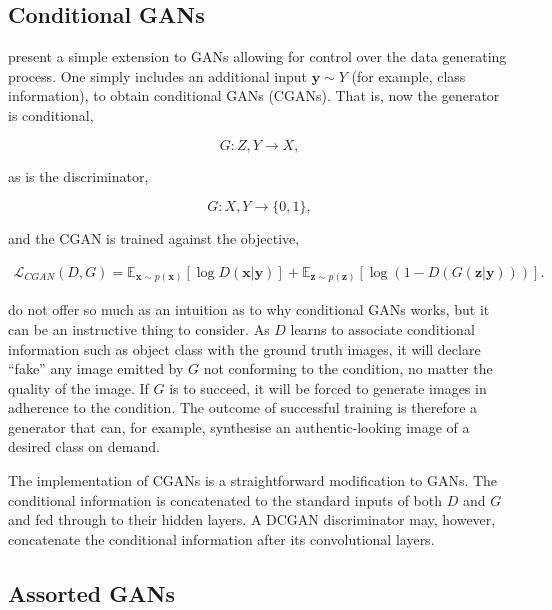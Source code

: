 \subsection{Conditional GANs}
\label{subsec:conditional_gans_definition}
\cite{mirza2014conditional} present a simple extension to GANs allowing for control over the data generating process. One simply includes an additional input $\mathbf{y} \sim Y$ (for example, class information), to obtain conditional GANs (CGANs). That is, now the generator is conditional,

\begin{equation}
G : Z, Y \to X,
\end{equation}

as is the discriminator,

\begin{equation}
G : X, Y \to \{0, 1\},
\end{equation}

and the CGAN is trained against the objective,

\begin{align}\mathcal{L}_{CGAN}(D, G) = \mathbb{E}_{\mathbf{x} \sim p(\mathbf{x})}[\log D(\mathbf{x} | \mathbf{y})] + \mathbb{E}_{\mathbf{z} \sim p(\mathbf{z})}[\log(1 - D(G(\mathbf{z} | \mathbf{y})))].
\end{align}

\cite{mirza2014conditional} do not offer so much as an intuition as to why conditional GANs works, but it can be an instructive thing to consider. As $D$ learns to associate conditional information such as object class with the ground truth images, it will declare ``fake'' any image emitted by $G$ not conforming to the condition, no matter the quality of the image. If $G$ is to succeed, it will be forced to generate images in adherence to the condition. The outcome of successful training is therefore a generator that can, for example, synthesise an authentic-looking image of a desired class on demand.

The implementation of CGANs is a straightforward modification to GANs. The conditional information is concatenated to the standard inputs of both $D$ and $G$ and fed through to their hidden layers. A DCGAN discriminator may, however, concatenate the conditional information after its convolutional layers.

\subsection{Assorted GANs}

